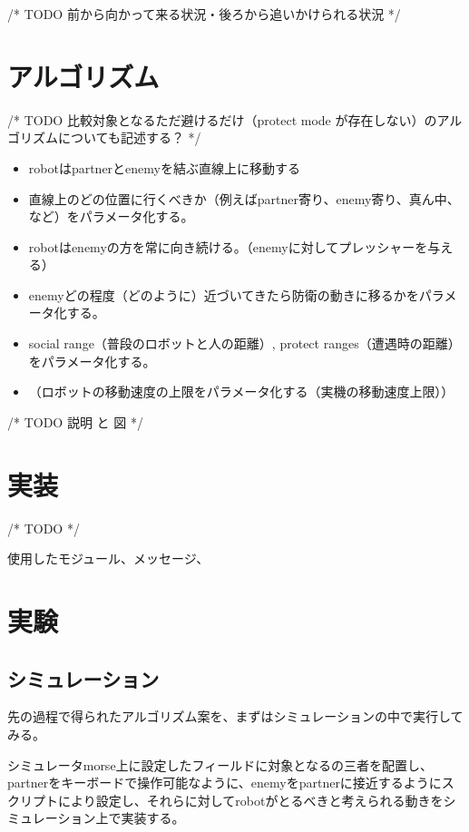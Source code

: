 \documentclass[12pt,titlepage]{jsarticle}
\begin{document}
/* TODO 前から向かって来る状況・後ろから追いかけられる状況 */

\section{アルゴリズム}

/* TODO 比較対象となるただ避けるだけ（protect mode が存在しない）のアルゴリズムについても記述する？ */

\begin{itemize}
	\item robotはpartnerとenemyを結ぶ直線上に移動する
	\item 直線上のどの位置に行くべきか（例えばpartner寄り、enemy寄り、真ん中、など）をパラメータ化する。
	\item robotはenemyの方を常に向き続ける。（enemyに対してプレッシャーを与える）
	\item enemyどの程度（どのように）近づいてきたら防衛の動きに移るかをパラメータ化する。
	\item social range（普段のロボットと人の距離）, protect ranges（遭遇時の距離）をパラメータ化する。
	\item （ロボットの移動速度の上限をパラメータ化する（実機の移動速度上限））
\end{itemize}



/* TODO 説明 と 図 */

\section{実装}

/* TODO */

使用したモジュール、メッセージ、

\section{実験}

\subsection{シミュレーション}
先の過程で得られたアルゴリズム案を、まずはシミュレーションの中で実行してみる。

シミュレータmorse上に設定したフィールドに対象となるの三者を配置し、partnerをキーボードで操作可能なように、enemyをpartnerに接近するようにスクリプトにより設定し、それらに対してrobotがとるべきと考えられる動きをシミュレーション上で実装する。
\end{document}
